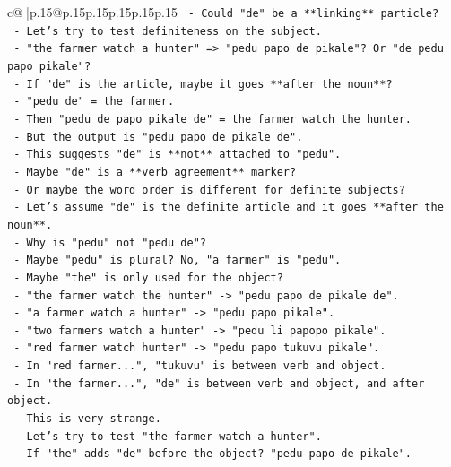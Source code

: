 \documentclass{article}
\begin{document}
{\begin{supertabular}{c@{$\;$}|p{.15\linewidth}@{}p{.15\linewidth}p{.15\linewidth}p{.15\linewidth}p{.15\linewidth}p{.15\linewidth}}
{{{\texttt{           {-} Could "de" be a **linking** particle?} \\
\texttt{           {-} Let's try to test definiteness on the subject.} \\
\texttt{           {-} "the farmer watch a hunter" => "pedu papo de pikale"? Or "de pedu papo pikale"?} \\
\texttt{           {-} If "de" is the article, maybe it goes **after the noun**?} \\
\texttt{           {-} "pedu de" = the farmer.} \\
\texttt{           {-} Then "pedu de papo pikale de" = the farmer watch the hunter.} \\
\texttt{           {-} But the output is "pedu papo de pikale de".} \\
\texttt{           {-} This suggests "de" is **not** attached to "pedu".} \\
\texttt{           {-} Maybe "de" is a **verb agreement** marker?} \\
\texttt{           {-} Or maybe the word order is different for definite subjects?} \\
\texttt{           {-} Let's assume "de" is the definite article and it goes **after the noun**.} \\
\texttt{           {-} Why is "pedu" not "pedu de"?} \\
\texttt{           {-} Maybe "pedu" is plural? No, "a farmer" is "pedu".} \\
\texttt{           {-} Maybe "the" is only used for the object?} \\
\texttt{           {-} "the farmer watch the hunter" {-}> "pedu papo de pikale de".} \\
\texttt{           {-} "a farmer watch a hunter" {-}> "pedu papo pikale".} \\
\texttt{           {-} "two farmers watch a hunter" {-}> "pedu li papopo pikale".} \\
\texttt{           {-} "red farmer watch hunter" {-}> "pedu papo tukuvu pikale".} \\
\texttt{           {-} In "red farmer...", "tukuvu" is between verb and object.} \\
\texttt{           {-} In "the farmer...", "de" is between verb and object, and after object.} \\
\texttt{           {-} This is very strange.} \\
\texttt{           {-} Let's try to test "the farmer watch a hunter".} \\
\texttt{           {-} If "the" adds "de" before the object? "pedu papo de pikale".} \\
}}}
\end{supertabular}}
\end{document}

